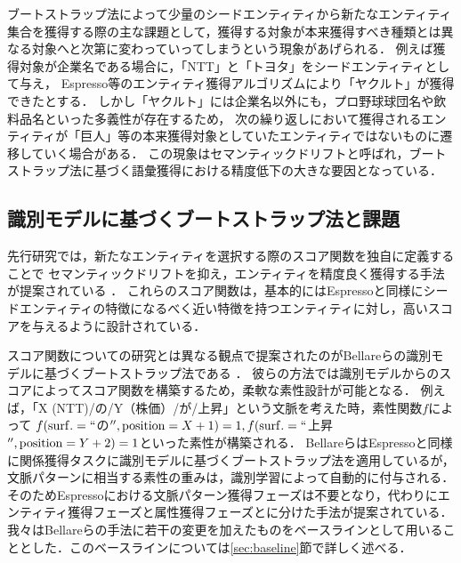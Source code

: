 \documentclass[japanese]{jnlp_1.4}
\begin{document}
ブートストラップ法によって少量のシードエンティティから新たなエンティティ集合を獲得する際の主な課題として，獲得する対象が本来獲得すべき種類とは異なる対象へと次第に変わっていってしまうという現象があげられる．
例えば獲得対象が企業名である場合に，「NTT」と「トヨタ」をシードエンティティとして与え，
Espresso等のエンティティ獲得アルゴリズムにより「ヤクルト」が獲得できたとする． 
しかし「ヤクルト」には企業名以外にも，プロ野球球団名や飲料品名といった多義性が存在するため，
次の繰り返しにおいて獲得されるエンティティが「巨人」等の本来獲得対象としていたエンティティではないものに遷移していく場合がある．
この現象はセマンティックドリフトと呼ばれ，ブートストラップ法に基づく語彙獲得における精度低下の大きな要因となっている．

\subsection{識別モデルに基づくブートストラップ法と課題}
\label{sec:problem}


先行研究では，新たなエンティティを選択する際のスコア関数を独自に定義することで
セマンティックドリフトを抑え，エンティティを精度良く獲得する手法が提案されている
\cite{thelen2002bootstrapping,sarmento2007more}．
これらのスコア関数は，基本的にはEspressoと同様にシードエンティティの特徴になるべく近い特徴を持つエンティティに対し，高いスコアを与えるように設計されている．


スコア関数についての研究とは異なる観点で提案されたのがBellareらの識別モデルに基づくブートストラップ法である \cite{bellare2007lightly}．
彼らの方法では識別モデルからのスコアによってスコア関数を構築するため，柔軟な素性設計が可能となる．
例えば，「X (NTT)/の/Y（株価）/が/上昇」という文脈を考えた時，素性関数$f$によって
$f({\rm surf.}=``$の$'',{\rm position}=X+1)=1,\\ f({\rm surf.}=``$上昇$'',{\rm position}=Y+2)=1$といった素性が構築される．
BellareらはEspressoと同様に関係獲得タスクに識別モデルに基づくブートストラップ法を適用しているが，文脈パターンに相当する素性の重みは，識別学習によって自動的に付与される．
そのためEspressoにおける文脈パターン獲得フェーズは不要となり，代わりにエンティティ獲得フェーズと属性獲得フェーズとに分けた手法が提案されている．
我々はBellareらの手法に若干の変更を加えたものをベースラインとして用いることとした．このベースラインについては\ref{sec:baseline}節で詳しく述べる．
\end{document}
